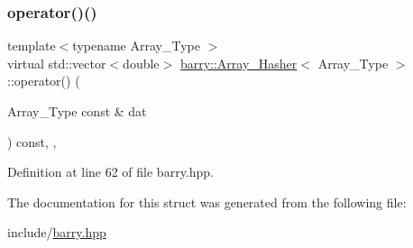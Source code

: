 \subsubsection{\texorpdfstring{operator()()}{operator()()}}
{\footnotesize\ttfamily template$<$typename Array\+\_\+\+Type $>$ \\
virtual std\+::vector$<$double$>$ \hyperlink{structbarry_1_1_array___hasher}{barry\+::\+Array\+\_\+\+Hasher}$<$ Array\+\_\+\+Type $>$\+::operator() (\begin{DoxyParamCaption}\item[{Array\+\_\+\+Type const \&}]{dat }\end{DoxyParamCaption}) const\hspace{0.3cm}{\ttfamily [inline]}, {\ttfamily [virtual]}, {\ttfamily [noexcept]}}



Definition at line 62 of file barry.\+hpp.



The documentation for this struct was generated from the following file\+:\begin{DoxyCompactItemize}
\item 
include/\hyperlink{barry_8hpp}{barry.\+hpp}\end{DoxyCompactItemize}
